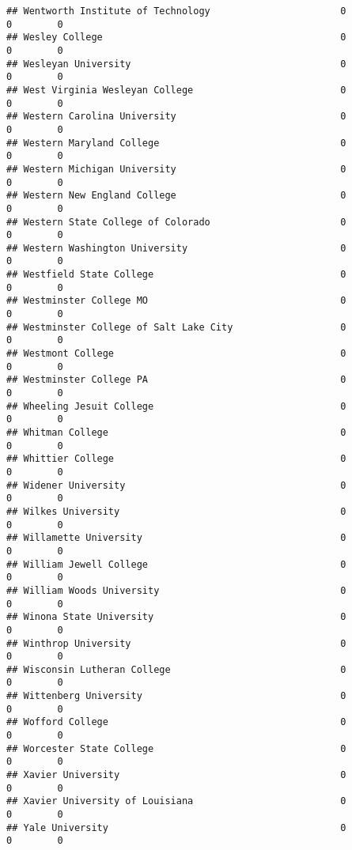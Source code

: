\documentclass[
]{article}
\begin{document}
\begin{verbatim}
## Wentworth Institute of Technology                       0           0        0
## Wesley College                                          0           0        0
## Wesleyan University                                     0           0        0
## West Virginia Wesleyan College                          0           0        0
## Western Carolina University                             0           0        0
## Western Maryland College                                0           0        0
## Western Michigan University                             0           0        0
## Western New England College                             0           0        0
## Western State College of Colorado                       0           0        0
## Western Washington University                           0           0        0
## Westfield State College                                 0           0        0
## Westminster College MO                                  0           0        0
## Westminster College of Salt Lake City                   0           0        0
## Westmont College                                        0           0        0
## Westminster College PA                                  0           0        0
## Wheeling Jesuit College                                 0           0        0
## Whitman College                                         0           0        0
## Whittier College                                        0           0        0
## Widener University                                      0           0        0
## Wilkes University                                       0           0        0
## Willamette University                                   0           0        0
## William Jewell College                                  0           0        0
## William Woods University                                0           0        0
## Winona State University                                 0           0        0
## Winthrop University                                     0           0        0
## Wisconsin Lutheran College                              0           0        0
## Wittenberg University                                   0           0        0
## Wofford College                                         0           0        0
## Worcester State College                                 0           0        0
## Xavier University                                       0           0        0
## Xavier University of Louisiana                          0           0        0
## Yale University                                         0           0        0

\end{verbatim}
\end{document}
